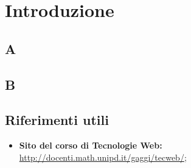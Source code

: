 \documentclass[../relazione.tex]{subfiles}
\begin{document}
\section{Introduzione}
	\subsection{A}
	\subsection{B}
	\subsection{Riferimenti utili}
		\begin{itemize}
			\item \textbf{Sito del corso di Tecnologie Web:} \\\url{http://docenti.math.unipd.it/gaggi/tecweb/};
		\end{itemize}
\end{document}
